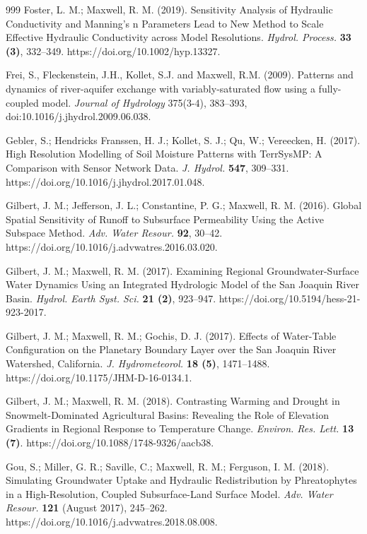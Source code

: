 \begin{thebibliography}{999}
Foster, L. M.; Maxwell, R. M. (2019). Sensitivity Analysis of Hydraulic Conductivity and Manning’s n Parameters Lead to New Method to Scale Effective Hydraulic Conductivity across Model Resolutions. {\em Hydrol. Process.} {\bf 33 (3)}, 332–349. https://doi.org/10.1002/hyp.13327.


Frei, S., Fleckenstein, J.H., Kollet, S.J. and Maxwell, R.M. (2009). Patterns and dynamics of river-aquifer exchange with variably-saturated flow using a fully-coupled model. {\em Journal of Hydrology} 375(3-4), 383--393, doi:10.1016/j.jhydrol.2009.06.038.

Gebler, S.; Hendricks Franssen, H. J.; Kollet, S. J.; Qu, W.; Vereecken, H. (2017). High Resolution Modelling of Soil Moisture Patterns with TerrSysMP: A Comparison with Sensor Network Data. {\em J. Hydrol.} {\bf 547}, 309–331. https://doi.org/10.1016/j.jhydrol.2017.01.048.


Gilbert, J. M.; Jefferson, J. L.; Constantine, P. G.; Maxwell, R. M. (2016). Global Spatial Sensitivity of Runoff to Subsurface Permeability Using the Active Subspace Method. {\em Adv. Water Resour.} {\bf 92}, 30–42. https://doi.org/10.1016/j.advwatres.2016.03.020.


Gilbert, J. M.; Maxwell, R. M. (2017). Examining Regional Groundwater-Surface Water Dynamics Using an Integrated Hydrologic Model of the San Joaquin River Basin. {\em Hydrol. Earth Syst. Sci.} {\bf 21 (2)}, 923–947. https://doi.org/10.5194/hess-21-923-2017.

Gilbert, J. M.; Maxwell, R. M.; Gochis, D. J. (2017). Effects of Water-Table Configuration on the Planetary Boundary Layer over the San Joaquin River Watershed, California. {\em J. Hydrometeorol.} {\bf 18 (5)}, 1471–1488. https://doi.org/10.1175/JHM-D-16-0134.1.


Gilbert, J. M.; Maxwell, R. M. (2018). Contrasting Warming and Drought in Snowmelt-Dominated Agricultural Basins: Revealing the Role of Elevation Gradients in Regional Response to Temperature Change. {\em Environ. Res. Lett.} {\bf 13 (7)}. https://doi.org/10.1088/1748-9326/aacb38.


Gou, S.; Miller, G. R.; Saville, C.; Maxwell, R. M.; Ferguson, I. M. (2018). Simulating Groundwater Uptake and Hydraulic Redistribution by Phreatophytes in a High-Resolution, Coupled Subsurface-Land Surface Model. {\em Adv. Water Resour.} {\bf 121} (August 2017), 245–262. https://doi.org/10.1016/j.advwatres.2018.08.008.


\end{thebibliography}
